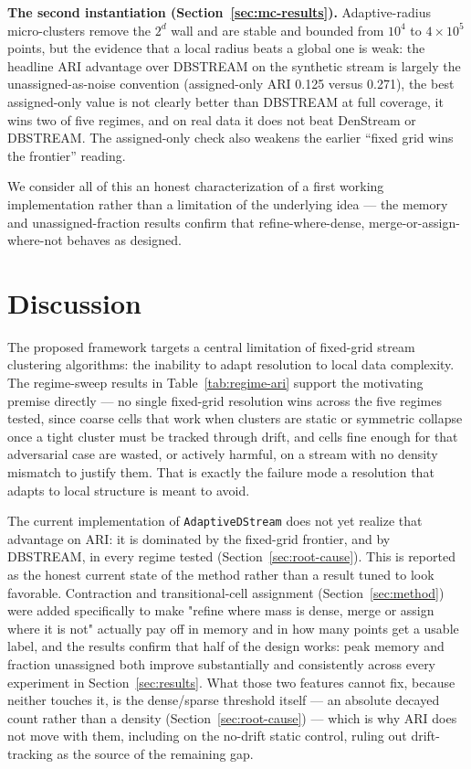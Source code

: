 \documentclass[11pt]{article}
\begin{document}
\textbf{The second instantiation (Section~\ref{sec:mc-results}).} Adaptive-radius micro-clusters remove the $2^d$ wall and are stable and bounded from $10^4$ to $4\times10^5$ points, but the evidence that a local radius beats a global one is weak: the headline ARI advantage over DBSTREAM on the synthetic stream is largely the unassigned-as-noise convention (assigned-only ARI 0.125 versus 0.271), the best assigned-only value is not clearly better than DBSTREAM at full coverage, it wins two of five regimes, and on real data it does not beat DenStream or DBSTREAM. The assigned-only check also weakens the earlier ``fixed grid wins the frontier'' reading.

We consider all of this an honest characterization of a first working implementation rather than a limitation of the underlying idea — the memory and unassigned-fraction results confirm that refine-where-dense, merge-or-assign-where-not behaves as designed.

\section{Discussion}

The proposed framework targets a central limitation of fixed-grid stream clustering algorithms: the inability to adapt resolution to local data complexity. The regime-sweep results in Table~\ref{tab:regime-ari} support the motivating premise directly — no single fixed-grid resolution wins across the five regimes tested, since coarse cells that work when clusters are static or symmetric collapse once a tight cluster must be tracked through drift, and cells fine enough for that adversarial case are wasted, or actively harmful, on a stream with no density mismatch to justify them. That is exactly the failure mode a resolution that adapts to local structure is meant to avoid.

The current implementation of \texttt{AdaptiveDStream} does not yet realize that advantage on ARI: it is dominated by the fixed-grid frontier, and by DBSTREAM, in every regime tested (Section~\ref{sec:root-cause}). This is reported as the honest current state of the method rather than a result tuned to look favorable. Contraction and transitional-cell assignment (Section~\ref{sec:method}) were added specifically to make "refine where mass is dense, merge or assign where it is not" actually pay off in memory and in how many points get a usable label, and the results confirm that half of the design works: peak memory and fraction unassigned both improve substantially and consistently across every experiment in Section~\ref{sec:results}. What those two features cannot fix, because neither touches it, is the dense/sparse threshold itself — an absolute decayed count rather than a density (Section~\ref{sec:root-cause}) — which is why ARI does not move with them, including on the no-drift static control, ruling out drift-tracking as the source of the remaining gap.
\end{document}

